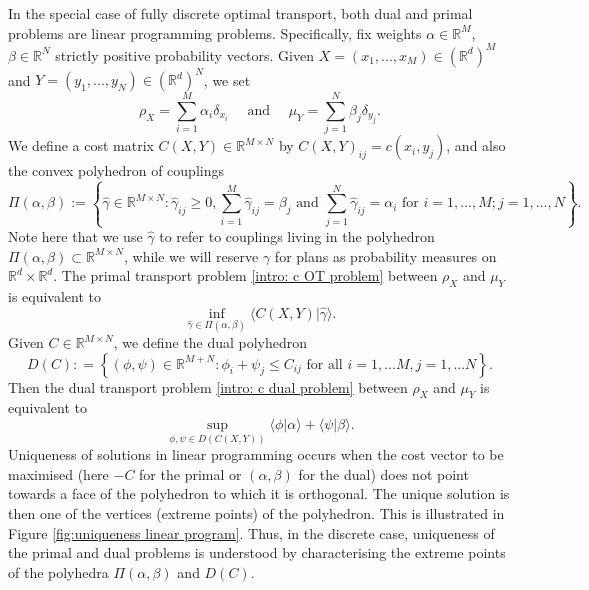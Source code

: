 \documentclass[11pt, oneside, titlepage]{book}
\theoremstyle{plain}
\theoremstyle{definition}
\newcommand{\R}{\mathbb{R}}
\begin{document}
In the special case of fully discrete optimal transport, both dual and primal problems are linear programming problems. Specifically, fix weights $\alpha \in \R^M$, $\beta \in \R^N$ strictly positive probability vectors. Given $X = (x_1, ..., x_M) \in (\R^d)^M$ and $Y = (y_1,...,y_N) \in (\R^d)^N$, we set
\begin{equation}
\label{eq: rho x and mu y definition}
   \rho_X = \sum_{i =1}^M \alpha_i \delta_{x_i} \quad \text{ and } \quad \mu_Y = \sum_{j=1}^N \beta_j\delta_{y_j}.
\end{equation}
We define a cost matrix $C(X, Y) \in \R^{M \times N}$ by $C(X, Y)_{ij} = c(x_i, y_j)$, and also the convex polyhedron of couplings
\begin{equation*}
    \Pi(\alpha, \beta) := \left\{ \hat\gamma \in \R^{M \times N} : \hat\gamma_{ij} \geq 0, \sum_{i = 1}^M \hat\gamma_{ij} = \beta_j \text{ and } \sum_{j = 1}^N \hat\gamma_{ij} = \alpha_i \text{ for } i=1,...,M; j=1,...,N \right\}.
\end{equation*}
Note here that we use $\hat \gamma$ to refer to couplings living in the polyhedron $\Pi(\alpha, \beta) \subset \R^{M \times N}$, while we will reserve $\gamma$ for plans as probability measures on $\R^d \times \R^d$. The primal transport problem \eqref{intro: c OT problem} between $\rho_X$ and $\mu_Y$ is equivalent to
\begin{equation}
\label{eq: C(X, Y) linear programming problem}
    \inf_{\hat\gamma \in \Pi(\alpha, \beta)} \langle C(X, Y) | \hat\gamma \rangle.
\end{equation}
Given $C \in \R^{M \times N}$, we define the dual polyhedron
\begin{equation*}
    D(C) : = \left\{ (\phi, \psi) \in \R^{M + N} : \phi_i + \psi_j \leq C_{ij} \text{ for all } i=1,...M, j = 1,...N \right\}.
\end{equation*}
Then the dual transport problem \eqref{intro: c dual problem} between $\rho_X$ and $\mu_Y$ is equivalent to
\begin{equation}
\label{eq: C(X, Y) dual linear programming problem}
    \sup_{\phi, \psi \in D(C(X, Y))} \langle \phi | \alpha \rangle + \langle \psi | \beta \rangle.
\end{equation}
Uniqueness of solutions in linear programming occurs when the cost vector to be maximised (here $-C$ for the primal or $(\alpha, \beta)$ for the dual) does not point towards a face of the polyhedron to which it is orthogonal. The unique solution is then one of the vertices (extreme points) of the polyhedron. This is illustrated in Figure \ref{fig:uniqueness linear program}. Thus, in the discrete case, uniqueness of the primal and dual problems is understood by characterising the extreme points of the polyhedra $\Pi(\alpha, \beta)$ and $D(C)$.
\end{document}
